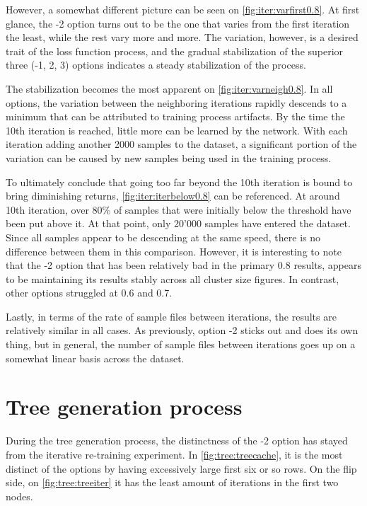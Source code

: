 However, a somewhat different picture can be seen on \cref{fig:iter:varfirst0.8}. 
At first glance, the -2 option turns out to be the one that varies from the first iteration the least, while the rest vary more and more.
The variation, however, is a desired trait of the loss function process, and the gradual stabilization of the superior three (-1, 2, 3) options indicates a steady stabilization of the process.

The stabilization becomes the most apparent on \cref{fig:iter:varneigh0.8}. 
In all options, the variation between the neighboring iterations rapidly descends to a minimum that can be attributed to training process artifacts.
By the time the 10th iteration is reached, little more can be learned by the network.
With each iteration adding another 2000 samples to the dataset, a significant portion of the variation can be caused by new samples being used in the training process.

To ultimately conclude that going too far beyond the 10th iteration is bound to bring diminishing returns, \cref{fig:iter:iterbelow0.8} can be referenced.
At around 10th iteration, over 80\% of samples that were initially below the threshold have been put above it.
At that point, only 20'000 samples have entered the dataset.
Since all samples appear to be descending at the same speed, there is no difference between them in this comparison.
However, it is interesting to note that the -2 option that has been relatively bad in the primary 0.8 results, appears to be maintaining its results stably across all cluster size figures. 
In contrast, other options struggled at 0.6 and 0.7.

Lastly, in terms of the rate of sample files between iterations, the results are relatively similar in all cases. 
As previously, option -2 sticks out and does its own thing, but in general, the number of sample files between iterations goes up on a somewhat linear basis across the dataset.


\section{Tree generation process}
During the tree generation process, the distinctness of the -2 option has stayed from the iterative re-training experiment.
In \cref{fig:tree:treecache}, it is the most distinct of the options by having excessively large first six or so rows.
On the flip side, on \cref{fig:tree:treeiter} it has the least amount of iterations in the first two nodes.

